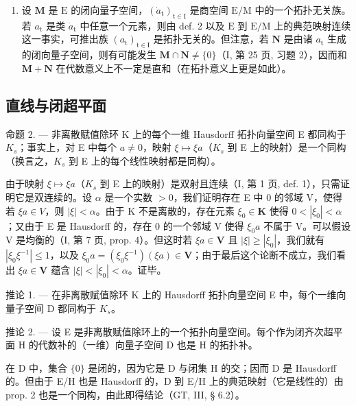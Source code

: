 \begin{enumerate}
\def\labelenumi{\arabic{enumi})}
\setcounter{enumi}{1}
\tightlist
\item
  设 \(\mathbf{M}\) 是 \(\mathrm{E}\) 的闭向量子空间，\((\dot{a}_{\mathrm{t}})_{\mathrm{t}\in \mathrm{I}}\) 是商空间 \(\mathrm{E / M}\) 中的一个拓扑无关族。若 \(a_{\mathrm{t}}\) 是类 \(\dot{a}_{\mathrm{t}}\) 中任意一个元素，则由 def. 2 以及 \(\mathrm{E}\) 到 \(\mathrm{E / M}\) 上的典范映射连续这一事实，可推出族 \((a_{\mathrm{t}})_{\mathrm{t}\in \mathrm{I}}\) 是拓扑无关的。但注意，若 \(\mathbf{N}\) 是由诸 \(a_{\mathrm{t}}\) 生成的闭向量子空间，则有可能发生 \(\mathbf{M} \cap \mathbf{N} \neq \{0\}\)（I, 第 25 页, 习题 2），因而和 \(\mathbf{M} + \mathbf{N}\) 在代数意义上不一定是直和（在拓扑意义上更是如此）。
\end{enumerate}

\subsection{直线与闭超平面}

命题 2. --- 非离散赋值除环 K 上的每个一维 Hausdorff 拓扑向量空间 E 都同构于 \(K_{s}\)；事实上，对 E 中每个 \(a \neq 0\)，映射 \(\xi \mapsto \xi a\)（\(K_{s}\) 到 E 上的映射）是一个同构（换言之，\(K_{s}\) 到 E 上的每个线性映射都是同构）。

由于映射 \(\xi \mapsto \xi a\)（\(K_{s}\) 到 E 上的映射）是双射且连续（I, 第 1 页, def. 1），只需证明它是双连续的。设 \(\alpha\) 是一个实数 \(>0\)，我们证明存在 E 中 0 的邻域 V，使得若 \(\xi a \in V\)，则 \(|\xi| < \alpha\)。由于 K 不是离散的，存在元素 \(\xi_0 \in \mathbf{K}\) 使得 \(0 < |\xi_0| < \alpha\)；又由于 E 是 Hausdorff 的，存在 0 的一个邻域 V 使得 \(\xi_0a\) 不属于 V。可以假设 V 是均衡的（I, 第 7 页, prop. 4）。但这时若 \(\xi a \in \mathbf{V}\) 且 \(|\xi| \geqslant |\xi_0|\)，我们就有 \(|\xi_0\xi^{-1}| \leqslant 1\)，以及 \(\xi_0a = (\xi_0\xi^{-1})(\xi a) \in \mathbf{V}\)；由于最后这个论断不成立，我们看出 \(\xi a \in \mathbf{V}\) 蕴含 \(|\xi| < |\xi_0| < \alpha\)。证毕。

推论 1. --- 在非离散赋值除环 K 上的 Hausdorff 拓扑向量空间 E 中，每个一维向量子空间 D 都同构于 \(K_{s}\)。

推论 2. --- 设 E 是非离散赋值除环上的一个拓扑向量空间。每个作为闭齐次超平面 H 的代数补的（一维）向量子空间 D 也是 H 的拓扑补。

在 D 中，集合 \(\{0\}\) 是闭的，因为它是 D 与闭集 H 的交；因而 D 是 Hausdorff 的。但由于 E/H 也是 Hausdorff 的，D 到 E/H 上的典范映射（它是线性的）由 prop. 2 也是一个同构，由此即得结论（GT, III, § 6.2）。

